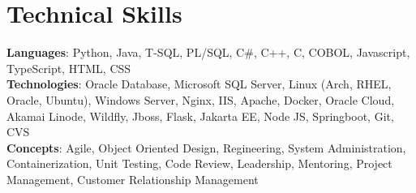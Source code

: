 \section{Technical Skills}
    \begin{itemize}[leftmargin=0.15in, label={}]
	\small{\item{
		\textbf{Languages}{: Python, Java, T-SQL, PL/SQL, C\#, C++, C, COBOL, Javascript, TypeScript, HTML, CSS} \\
		\textbf{Technologies}{: Oracle Database, Microsoft SQL Server, Linux (Arch, RHEL, Oracle, Ubuntu), Windows Server, Nginx, IIS, Apache, Docker, Oracle Cloud, Akamai Linode, Wildfly, Jboss, Flask, Jakarta EE, Node JS, Springboot, Git, CVS} \\
		\textbf{Concepts}{: Agile, Object Oriented Design, Regineering, System Administration, Containerization, Unit Testing, Code Review, Leadership, Mentoring, Project Management, Customer Relationship Management}
	}}
    \end{itemize}